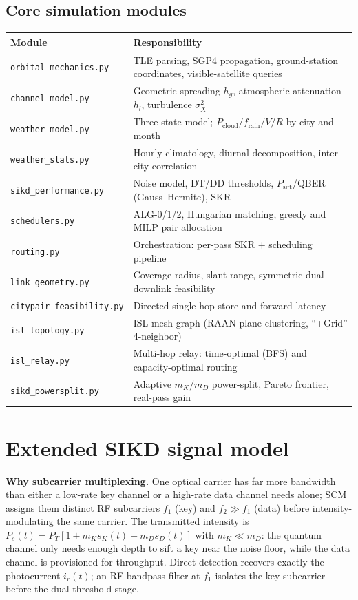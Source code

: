 \subsection{Core simulation modules}
\begin{center}\small\renewcommand{\arraystretch}{1.15}
\begin{longtable}{@{}p{}p{}@{}}
\toprule \textbf{Module} & \textbf{Responsibility} \\ \midrule \endhead
\texttt{orbital\_mechanics.py} & TLE parsing, SGP4 propagation, ground-station coordinates, visible-satellite queries \\
\texttt{channel\_model.py} & Geometric spreading $h_g$, atmospheric attenuation $h_l$, turbulence $\sigma_X^2$ \\
\texttt{weather\_model.py} & Three-state model; $P_\text{cloud}/f_\text{rain}/V/R$ by city and month \\
\texttt{weather\_stats.py} & Hourly climatology, diurnal decomposition, inter-city correlation \\
\texttt{sikd\_performance.py} & Noise model, DT/DD thresholds, $P_\text{sift}$/QBER (Gauss--Hermite), SKR \\
\texttt{schedulers.py} & ALG-0/1/2, Hungarian matching, greedy and MILP pair allocation \\
\texttt{routing.py} & Orchestration: per-pass SKR + scheduling pipeline \\
\texttt{link\_geometry.py} & Coverage radius, slant range, symmetric dual-downlink feasibility \\
\texttt{citypair\_feasibility.py} & Directed single-hop store-and-forward latency \\
\texttt{isl\_topology.py} & ISL mesh graph (RAAN plane-clustering, ``+Grid'' 4-neighbor) \\
\texttt{isl\_relay.py} & Multi-hop relay: time-optimal (BFS) and capacity-optimal routing \\
\texttt{sikd\_powersplit.py} & Adaptive $m_K/m_D$ power-split, Pareto frontier, real-pass gain \\
\bottomrule
\end{longtable}\end{center}

\section{Extended SIKD signal model}
\textbf{Why subcarrier multiplexing.} One optical carrier has far more bandwidth than either a low-rate key channel or a high-rate data channel needs alone; SCM assigns them distinct RF subcarriers $f_1$ (key) and $f_2\gg f_1$ (data) before intensity-modulating the same carrier. The transmitted intensity is $P_s(t)=P_T[1+m_K s_K(t)+m_D s_D(t)]$ with $m_K\ll m_D$: the quantum channel only needs enough depth to sift a key near the noise floor, while the data channel is provisioned for throughput. Direct detection recovers exactly the photocurrent $i_r(t)$; an RF bandpass filter at $f_1$ isolates the key subcarrier before the dual-threshold stage.

